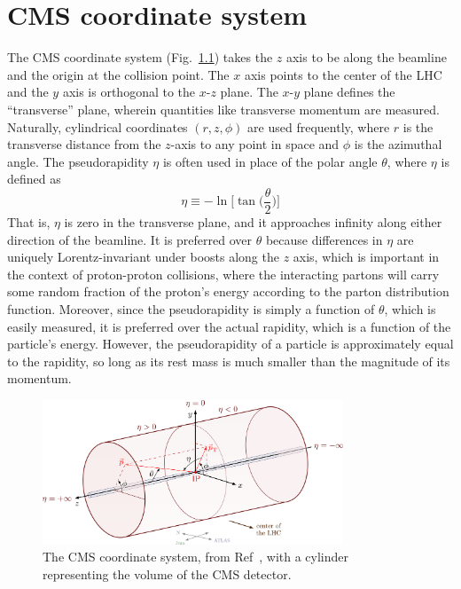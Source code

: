 \chapter{CMS coordinate system}\label{apdx:cms_coords}
The CMS coordinate system (Fig.~\ref{fig:cms_coords}) takes the $z$ axis to be along the beamline and the origin at the collision point. 
The $x$ axis points to the center of the LHC and the $y$ axis is orthogonal to the $x$-$z$ plane. 
The $x$-$y$ plane defines the ``transverse'' plane, wherein quantities like transverse momentum \pt are measured. 
Naturally, cylindrical coordinates $(r,z,\phi)$ are used frequently, where $r$ is the transverse distance from the $z$-axis to any point in space and $\phi$ is the azimuthal angle. 
The pseudorapidity $\eta$ is often used in place of the polar angle $\theta$, where $\eta$ is defined as
\begin{equation}
    \eta \equiv -\ln{\bigg[\tan\bigg(\frac{\theta}{2}\bigg)\bigg]}
\end{equation}
That is, $\eta$ is zero in the transverse plane, and it approaches infinity along either direction of the beamline. 
It is preferred over $\theta$ because differences in $\eta$ are uniquely Lorentz-invariant under boosts along the $z$ axis, which is important in the context of proton-proton collisions, where the interacting partons will carry some random fraction of the proton's energy according to the parton distribution function. 
Moreover, since the pseudorapidity is simply a function of $\theta$, which is easily measured, it is preferred over the actual rapidity, which is a function of the particle's energy. 
However, the pseudorapidity of a particle is approximately equal to the rapidity, so long as its rest mass is much smaller than the magnitude of its momentum. 

\begin{figure}[htb]
    \centering
    \includegraphics[width=0.8\textwidth]{fig/cms/coord_system.png}
    \caption[The CMS coordinate system]{
        The CMS coordinate system, from Ref~\cite{CMSCoords}, with a cylinder representing the volume of the CMS detector. 
    }
    \label{fig:cms_coords}
\end{figure}
